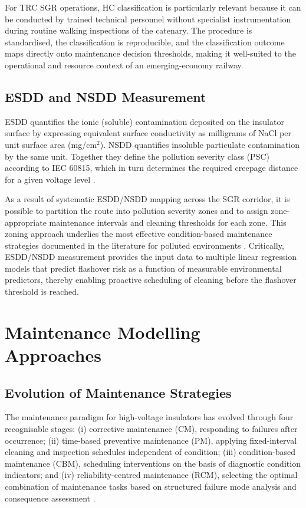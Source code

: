 \documentclass[preprint,12pt,3p]{elsarticle}
\begin{document}
For TRC SGR operations, HC classification is particularly relevant
because it can be conducted by trained technical personnel without
specialist instrumentation during routine walking inspections of the
catenary. The procedure is standardised, the classification is
reproducible, and the classification outcome maps directly onto
maintenance decision thresholds, making it well-suited to the
operational and resource context of an emerging-economy railway.

\subsection{ESDD and NSDD Measurement}

ESDD quantifies the ionic (soluble) contamination deposited on the
insulator surface by expressing equivalent surface conductivity as
milligrams of NaCl per unit surface area (mg/cm$^2$). NSDD quantifies
insoluble particulate contamination by the same unit. Together they
define the pollution severity class (PSC) according to IEC 60815,
which in turn determines the required creepage distance for a given
voltage level \cite{IEC60815}.

As a result of systematic ESDD/NSDD mapping across the SGR corridor,
it is possible to partition the route into pollution severity zones
and to assign zone-appropriate maintenance intervals and cleaning
thresholds for each zone. This zoning approach underlies the most
effective condition-based maintenance strategies documented in the
literature for polluted environments \cite{Chege2019, Mehmood2022}.
Critically, ESDD/NSDD measurement provides the input data to multiple
linear regression models that predict flashover risk as a function of
measurable environmental predictors, thereby enabling proactive
scheduling of cleaning before the flashover threshold is reached.


\section{Maintenance Modelling Approaches}
\label{sec:maintenance}

\subsection{Evolution of Maintenance Strategies}

The maintenance paradigm for high-voltage insulators has evolved
through four recognisable stages: (i) corrective maintenance (CM),
responding to failures after occurrence; (ii) time-based preventive
maintenance (PM), applying fixed-interval cleaning and inspection
schedules independent of condition; (iii) condition-based maintenance
(CBM), scheduling interventions on the basis of diagnostic condition
indicators; and (iv) reliability-centred maintenance (RCM), selecting
the optimal combination of maintenance tasks based on structured failure
mode analysis and consequence assessment \cite{Dekker1996, Endrenyi2001}.
\end{document}
